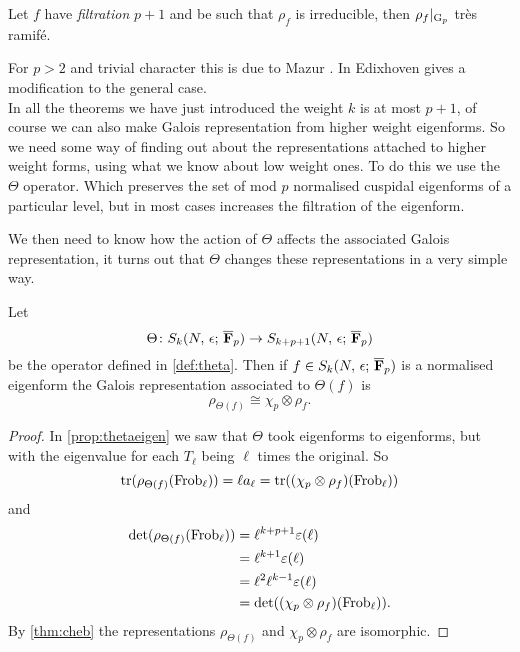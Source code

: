 \documentclass[a4paper,12pt]{article}
\begin{document}
\begin{thm}[Mazur]\label{thm:mazur}
Let $f$ have \emph{filtration} $p+1$ and be such that $\rho_{f}$ is irreducible, then $\rho_{f}|_{\mathrm{G}_p}$ tr\`es ramif\'e.
\end{thm} %

For $p> 2$ and trivial character this is due to Mazur \cite[sec. 6]{Ribet90}.
In \cite[sec. 2]{EdixhovenWeight} Edixhoven gives a modification to the general case.
\\[12pt] \noindent
In all the theorems we have just introduced the weight $k$ is at most $p+1$, of course we can also make Galois representation from higher weight eigenforms.
So we need some way of finding out about the representations attached to higher weight forms, using what we know about low weight ones.
To do this we use the $\Theta$ operator.
Which preserves the set of mod $p$ normalised cuspidal eigenforms of a particular level, but in most cases  increases the filtration of the eigenform.

We then need to know how the action of $\Theta$ affects the associated Galois representation, it turns out that $\Theta$ changes these representations in a very simple way.

\begin{prop}\label{prop:theta}
Let
\[
\Theta\colon S_k(N,\,\epsilon;\,\overline{\mathbf{F}}_p)\to S_{k+p+1}(N,\,\epsilon;\,\overline{\mathbf{F}}_p)
\]
be the operator defined in \cref{def:theta}.
Then if $f \in S_k(N,\,\epsilon;\,\overline{\mathbf{F}}_p)$ is a normalised eigenform the Galois representation associated to $\Theta(f)$ is
\[
\rho_{\Theta(f)} \cong \chi_p\otimes\rho_{f}.
\]
\end{prop}
\begin{proof}
In \cref{prop:thetaeigen} we saw that $\Theta$ took eigenforms to eigenforms, but with the eigenvalue for each $T_{\ell}$ being $\ell$ times the original.
So
\[
\operatorname{tr}(\rho_{\Theta(f)}(\operatorname{Frob}_\ell)) = \ell a_{\ell} = \operatorname{tr}((\chi_p \otimes \rho_{f})(\operatorname{Frob}_{\ell}))
\]
and
\begin{align*}
\det(\rho_{\Theta(f)}(\operatorname{Frob}_\ell)) &= \ell^{k+p+1}\varepsilon(\ell)\\
                                   &= \ell^{k+1}\varepsilon(\ell)\\
                                   &= \ell^2\ell^{k-1}\varepsilon(\ell)\\
                                   &= \det((\chi_p \otimes \rho_{f})(\operatorname{Frob}_{\ell})).
\end{align*}
By \cref{thm:cheb} the representations $\rho_{\Theta(f)}$ and $\chi_p \otimes \rho_{f}$ are isomorphic.
\end{proof}
\end{document}

